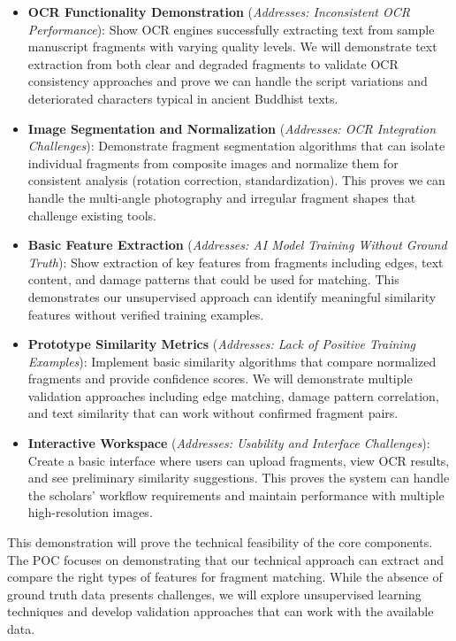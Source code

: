 \documentclass{article}
\begin{document}
\begin{itemize}
\item \textbf{OCR Functionality Demonstration} (\textit{Addresses: Inconsistent OCR Performance}): Show OCR engines successfully extracting text from sample manuscript fragments with varying quality levels. We will demonstrate text extraction from both clear and degraded fragments to validate OCR consistency approaches and prove we can handle the script variations and deteriorated characters typical in ancient Buddhist texts.

\item \textbf{Image Segmentation and Normalization} (\textit{Addresses: OCR Integration Challenges}): Demonstrate fragment segmentation algorithms that can isolate individual fragments from composite images and normalize them for consistent analysis (rotation correction, standardization). This proves we can handle the multi-angle photography and irregular fragment shapes that challenge existing tools.

\item \textbf{Basic Feature Extraction} (\textit{Addresses: AI Model Training Without Ground Truth}): Show extraction of key features from fragments including edges, text content, and damage patterns that could be used for matching. This demonstrates our unsupervised approach can identify meaningful similarity features without verified training examples.

\item \textbf{Prototype Similarity Metrics} (\textit{Addresses: Lack of Positive Training Examples}): Implement basic similarity algorithms that compare normalized fragments and provide confidence scores. We will demonstrate multiple validation approaches including edge matching, damage pattern correlation, and text similarity that can work without confirmed fragment pairs.

\item \textbf{Interactive Workspace} (\textit{Addresses: Usability and Interface Challenges}): Create a basic interface where users can upload fragments, view OCR results, and see preliminary similarity suggestions. This proves the system can handle the scholars' workflow requirements and maintain performance with multiple high-resolution images.
\end{itemize}

This demonstration will prove the technical feasibility of the core components. The POC focuses on demonstrating that our technical approach can extract and compare the right types of features for fragment matching. While the absence of ground truth data presents challenges, we will explore unsupervised learning techniques and develop validation approaches that can work with the available data.
\end{document}

